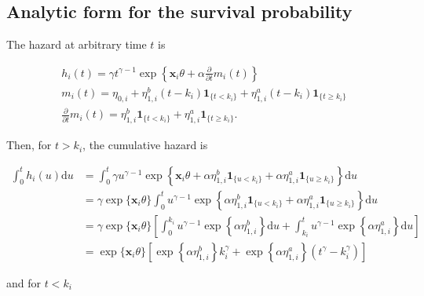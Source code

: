 \documentclass[
  10pt,
  a4paper,
]{article}
\begin{document}
\hypertarget{analytic-form-for-the-survival-probability}{%
\subsection{Analytic form for the survival
probability}\label{analytic-form-for-the-survival-probability}}

The hazard at arbitrary time \(t\) is

\begin{gather*}
  h_{i}(t) = \gamma t^{\gamma - 1} \exp\left\{\boldsymbol{x}_{i}\theta + \alpha \frac{\partial}{\partial t} m_{i}(t)\right\} \\
  m_{i}(t) = \eta_{0, i} + \eta^{b}_{1, i}(t - k_{i})\boldsymbol{1}_{\{t < k_{i}\}} + \eta^{a}_{1, i}(t - k_{i})\boldsymbol{1}_{\{t \geq k_{i}\}} \\
  \frac{\partial}{\partial t} m_{i}(t) = \eta^{b}_{1, i}\boldsymbol{1}_{\{t < k_{i}\}} + \eta^{a}_{1, i}\boldsymbol{1}_{\{t \geq k_{i}\}}.
\end{gather*}

Then, for \(t > k_{i}\), the cumulative hazard is

\begin{align*}
  \int_{0}^{t} h_{i}(u) \text{d}u
  &= \int_{0}^{t}
    \gamma u^{\gamma - 1}
    \exp\left\{
      \boldsymbol{x}_{i}\theta +
      \alpha \eta^{b}_{1, i}\boldsymbol{1}_{\{u < k_{i}\}} +
      \alpha \eta^{a}_{1, i}\boldsymbol{1}_{\{u \geq k_{i}\}}
    \right\}
    \text{d}u \\
  &= \gamma \exp\{\boldsymbol{x}_{i}\theta\}
    \int_{0}^{t}
      u^{\gamma - 1}
      \exp\left\{
        \alpha \eta^{b}_{1, i}\boldsymbol{1}_{\{u < k_{i}\}} +
        \alpha \eta^{a}_{1, i}\boldsymbol{1}_{\{u \geq k_{i}\}}
      \right\}
    \text{d}u \\
  &= \gamma \exp\{\boldsymbol{x}_{i}\theta\}
    \left[
      \int_{0}^{k_{i}}
        u^{\gamma - 1}
        \exp\left\{
          \alpha \eta^{b}_{1, i}
        \right\}
      \text{d}u
      +
      \int_{k_{i}}^{t}
        u^{\gamma - 1}
        \exp\left\{
          \alpha \eta^{a}_{1, i}
        \right\}
      \text{d}u
    \right] \\
  &= \exp\{\boldsymbol{x}_{i}\theta\}
    \left[
      \exp\left\{
        \alpha \eta^{b}_{1, i}
      \right\}
      k_{i}^{\gamma}
      +
      \exp\left\{
        \alpha \eta^{a}_{1, i}
      \right\}
      (t^{\gamma} - k_{i}^{\gamma})
    \right]
\end{align*}

and for \(t < k_{i}\)
\end{document}
